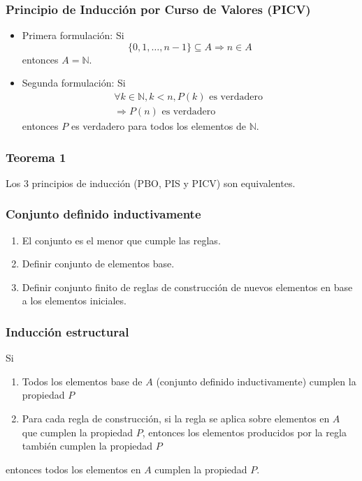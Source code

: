 \begin{multicols}{2}
    \subsubsection*{Principio de Inducción por Curso de Valores (PICV)}
    \begin{itemize}
        \item Primera formulación:
        Si
        $$
        \{0,1,\ldots,n - 1\} \subseteq A \Rightarrow n \in A
        $$
        entonces $A = \mathbb{N}$.
        \item Segunda formulación:
        Si
        \begin{align*}
        \forall k \in \mathbb{N}, k < n, P(k) \text{ es verdadero } \\
        \Rightarrow P(n)
        \text{ es verdadero}
        \end{align*}
        entonces $P$ es verdadero para todos los elementos de $\mathbb{N}$.
    \end{itemize}
    
    \subsubsection*{Teorema 1}
    Los 3 principios de inducción (PBO, PIS y PICV) son equivalentes.
    
    \subsubsection*{Conjunto definido inductivamente}
    \begin{enumerate}
        \item El conjunto es el menor que cumple las reglas.
        \item Definir conjunto de elementos base.
        \item Definir conjunto finito de reglas de construcción de nuevos elementos en base a los elementos iniciales.
    \end{enumerate}
    
    \subsubsection*{Inducción estructural}
    Si
    \begin{enumerate}
        \item Todos los elementos base de $A$ (conjunto definido inductivamente) cumplen la propiedad $P$
        \item Para cada regla de construcción, si la regla se aplica sobre elementos en $A$ que cumplen la propiedad $P$, entonces los elementos producidos por la regla también cumplen la propiedad $P$
    \end{enumerate}
    entonces todos los elementos en $A$ cumplen la propiedad $P$.
    

\end{multicols}
